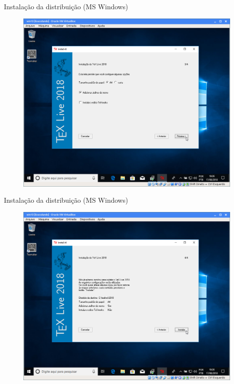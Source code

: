 \documentclass{beamer}
\begin{document}
\begin{frame}{Instala\c{c}\~ao da distribui\c{c}\~ao (MS Windows)}
    \begin{figure}[h]
        \includegraphics[scale=0.25]{fig/texlive-06.png}
    \end{figure}
\end{frame}

\begin{frame}{Instala\c{c}\~ao da distribui\c{c}\~ao (MS Windows)}
    \begin{figure}[h]
        \includegraphics[scale=0.25]{fig/texlive-07.png}
    \end{figure}
\end{frame}
\end{document}

